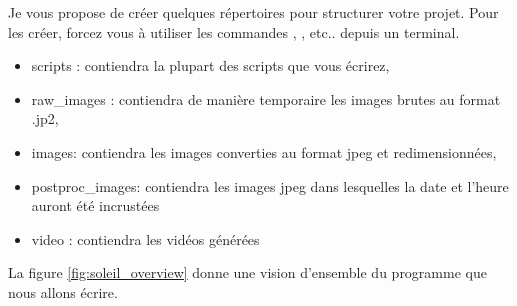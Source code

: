 Je vous propose de créer quelques répertoires pour structurer votre projet. Pour les créer, forcez vous à utiliser les commandes \mkdir, \ls, etc.. depuis un terminal.
\begin{itemize}
\item scripts : contiendra la plupart des scripts que vous écrirez,
\item raw\_images : contiendra de manière temporaire les images brutes au format .jp2,
\item images: contiendra les images converties au format jpeg et redimensionnées,
\item postproc\_images: contiendra les images jpeg dans lesquelles la date et l'heure auront été incrustées
\item video : contiendra les vidéos générées
\end{itemize}

La figure \ref{fig:soleil_overview} donne une vision d'ensemble du programme que nous allons écrire.

